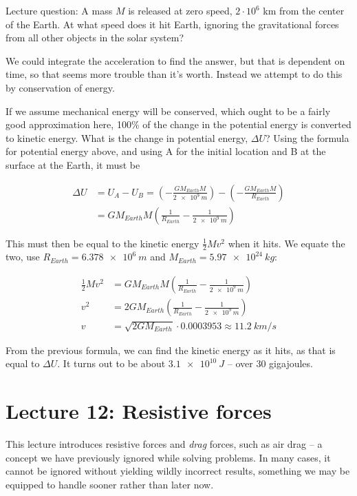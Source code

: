 Lecture question: A mass $M$ is released at zero speed, $2 \cdot 10^6$ km from the center of the Earth. At what speed does it hit Earth, ignoring the gravitational forces from all other objects in the solar system?

We could integrate the acceleration to find the answer, but that is dependent on time, so that seems more trouble than it's worth. 
Instead we attempt to do this by conservation of energy.

If we assume mechanical energy will be conserved, which ought to be a fairly good approximation here, 100\% of the change in the potential energy is converted to kinetic energy. What is the change in potential energy, $\Delta U$? Using the formula for potential energy above, and using A for the initial location and B at the surface at the Earth, it must be

\begin{align}
\Delta U &= U_A - U_B = \left(-\frac{G M_{Earth} M}{\SI{2e9}{m}}\right) - \left(-\frac{G M_{Earth} M}{R_{Earth}}\right)\\
         &= G M_{Earth} M \left( \frac{1}{R_{Earth}} - \frac{1}{\SI{2e9}{m}} \right)
\end{align}

This must then be equal to the kinetic energy $\displaystyle \frac{1}{2} M v^2$ when it hits. We equate the two, use $R_{Earth} = \SI{6.378e6}{m}$ and $M_{Earth} = \SI{5.97e24}{kg}$:

\begin{align}
\frac{1}{2} M v^2 &= G M_{Earth} M \left( \frac{1}{R_{Earth}} - \frac{1}{\SI{2e9}{m}} \right)\\
v^2 &= 2 G M_{Earth} \left( \frac{1}{R_{Earth}} - \frac{1}{\SI{2e9}{m}} \right)\\
v &= \sqrt{2 G M_{Earth}} \cdot 0.0003953 \approx \SI{11.2}{km/s}
\end{align}

From the previous formula, we can find the kinetic energy as it hits, as that is equal to $\Delta U$. It turns out to be about $\SI{3.1e10}{J}$ -- over 30 gigajoules.

\section{Lecture 12: Resistive forces}

This lecture introduces resistive forces and \emph{drag} forces, such as air drag -- a concept we have previously ignored while solving problems. In many cases, it cannot be ignored without yielding wildly incorrect results, something we may be equipped to handle sooner rather than later now.

